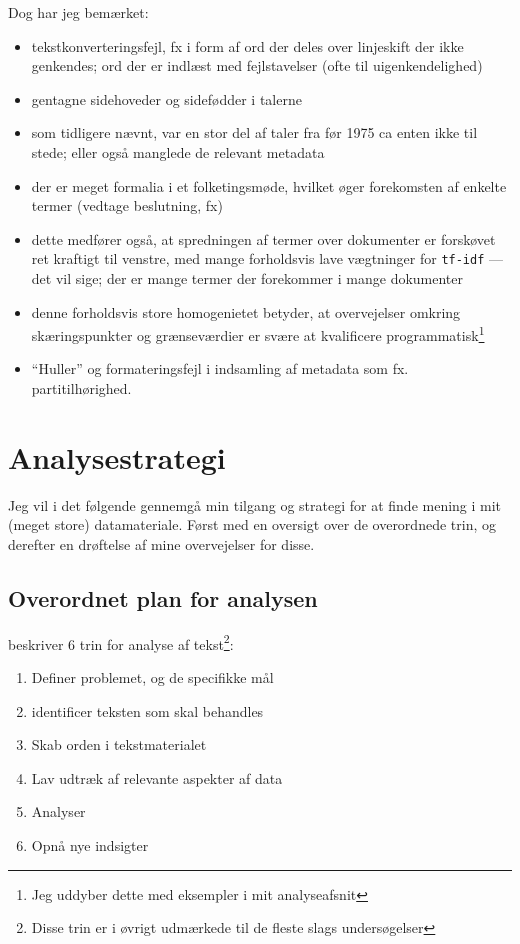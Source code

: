 Dog har jeg bemærket:
\begin{itemize}
  \item
    tekstkonverteringsfejl, fx i form af ord der deles over linjeskift der ikke genkendes; ord der er indlæst med fejlstavelser (ofte til uigenkendelighed)
  \item
    gentagne sidehoveder og sidefødder i talerne
  \item
    som tidligere nævnt, var en stor del af taler fra før 1975 ca enten ikke til stede; eller også manglede de relevant metadata
  \item
    der er meget formalia i et folketingsmøde, hvilket øger forekomsten af enkelte termer (vedtage beslutning, fx)
  \item
    dette medfører også, at spredningen af termer over dokumenter er forskøvet ret kraftigt til venstre, med mange forholdsvis lave vægtninger for \texttt{tf-idf} — det vil sige; der er mange termer der forekommer i mange dokumenter
  \item
    denne forholdsvis store homogenietet betyder, at overvejelser omkring skæringspunkter og grænseværdier er svære at kvalificere programmatisk\footnote{Jeg uddyber dette med eksempler i mit analyseafsnit}
  \item
    “Huller” og formateringsfejl i indsamling af metadata som fx. partitilhørighed.
\end{itemize}

\chapter{Analysestrategi}\label{chap:strategy}

Jeg vil i det følgende gennemgå min tilgang og strategi for at finde mening i mit (meget store) datamateriale.
Først med en oversigt over de overordnede trin, og derefter en drøftelse af mine overvejelser for disse. 

\section{Overordnet plan for analysen}\label{sec:plan}

\autocite[s. 17]{kwartlerTextMiningPractice2017} beskriver 6 trin for analyse af tekst\footnote{Disse
  trin er i øvrigt udmærkede til de fleste slags undersøgelser}:
\begin{enumerate}
  \item
    Definer problemet, og de specifikke mål
  \item
    identificer teksten som skal behandles
  \item
    Skab orden i tekstmaterialet
  \item
    Lav udtræk af relevante aspekter af data
  \item
    Analyser
  \item
    Opnå nye indsigter
\end{enumerate}

